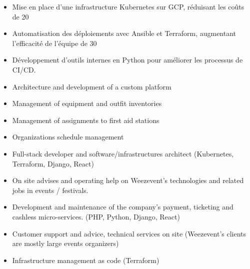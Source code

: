 
\begin{itemize}
    \item Mise en place d'une infrastructure Kubernetes sur GCP, réduisant les coûts de 20%
    \item Automatisation des déploiements avec Ansible et Terraform, augmentant l'efficacité de l'équipe de 30%
    \item Développement d'outils internes en Python pour améliorer les processus de CI/CD.
\end{itemize}

\divider

\begin{itemize}
    \item Architecture and development of a custom platform
    \item Management of equipment and outfit inventories
    \item Management of assignments to first aid stations
    \item Organizations schedule management
\end{itemize}

\divider

\begin{itemize}
    \item Full-stack developer and software/infrastructures architect (Kubernetes, Terraform, Django, React)
\end{itemize}

\divider

\begin{itemize}
    \item On site advises and operating help on Weezevent's technologies and related jobs in events / festivals.
\end{itemize}

\divider

\begin{itemize}
    \item Development and maintenance of the company's payment, ticketing and cashless micro-services. (PHP, Python, Django, React)
    \item Customer support and advice, technical services on site (Weezevent's clients are mostly large events organizers)
    \item Infrastructure management as code (Terraform)
\end{itemize}

